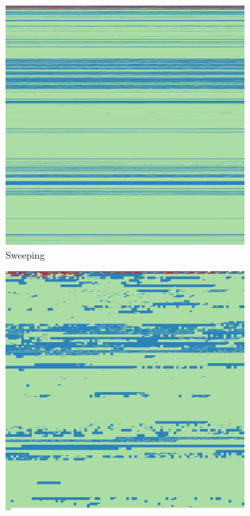 \documentclass[
  digital, %
  oneside, %
  lof,     %
  lot,     %
]{fithesis4}
\begin{document}
\begin{figure}
    \centering
    \begin{subfigure}[t]{.45\textwidth}
        \centering
        \includegraphics[width=\textwidth,interpolate=false]{figures/pv204_fde-chi2-4-sweeping.png}
        \caption{Sweeping}
        \label{fig:impl-sweeping}
    \end{subfigure}
    \hfill
    \begin{subfigure}[t]{.45\textwidth}
        \centering
        \includegraphics[width=\textwidth,interpolate=false]{figures/pv204_fde-chi2-4-sweeping-blocks.png}

\end{subfigure}
\end{figure}
\end{document}
